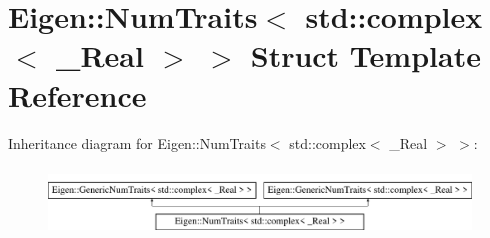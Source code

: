 \hypertarget{struct_eigen_1_1_num_traits_3_01std_1_1complex_3_01___real_01_4_01_4}{}\section{Eigen\+:\+:Num\+Traits$<$ std\+:\+:complex$<$ \+\_\+\+Real $>$ $>$ Struct Template Reference}
\label{struct_eigen_1_1_num_traits_3_01std_1_1complex_3_01___real_01_4_01_4}
Inheritance diagram for Eigen\+:\+:Num\+Traits$<$ std\+:\+:complex$<$ \+\_\+\+Real $>$ $>$\+:\begin{figure}[H]
\begin{center}
\leavevmode
\includegraphics[height=1.824104cm]{struct_eigen_1_1_num_traits_3_01std_1_1complex_3_01___real_01_4_01_4}
\end{center}
\end{figure}
